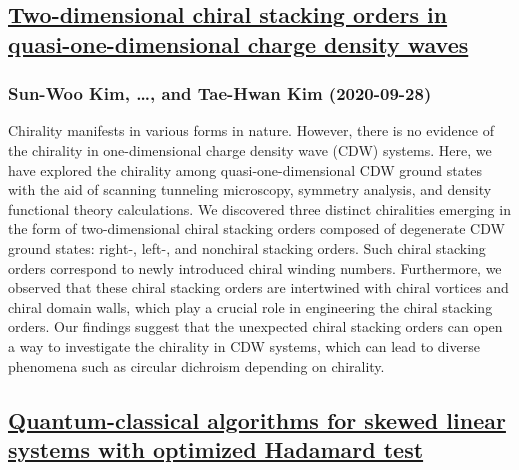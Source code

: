 \subsection*{\href{http://arxiv.org/abs/2009.13298v1}{Two-dimensional chiral stacking orders in quasi-one-dimensional charge  density waves}}
\subsubsection*{Sun-Woo Kim, \dots, and Tae-Hwan Kim (2020-09-28)}
Chirality manifests in various forms in nature. However, there is no evidence
of the chirality in one-dimensional charge density wave (CDW) systems. Here, we
have explored the chirality among quasi-one-dimensional CDW ground states with
the aid of scanning tunneling microscopy, symmetry analysis, and density
functional theory calculations. We discovered three distinct chiralities
emerging in the form of two-dimensional chiral stacking orders composed of
degenerate CDW ground states: right-, left-, and nonchiral stacking orders.
Such chiral stacking orders correspond to newly introduced chiral winding
numbers. Furthermore, we observed that these chiral stacking orders are
intertwined with chiral vortices and chiral domain walls, which play a crucial
role in engineering the chiral stacking orders. Our findings suggest that the
unexpected chiral stacking orders can open a way to investigate the chirality
in CDW systems, which can lead to diverse phenomena such as circular dichroism
depending on chirality.

\subsection*{\href{http://arxiv.org/abs/2009.13288v1}{Quantum-classical algorithms for skewed linear systems with optimized  Hadamard test}}
